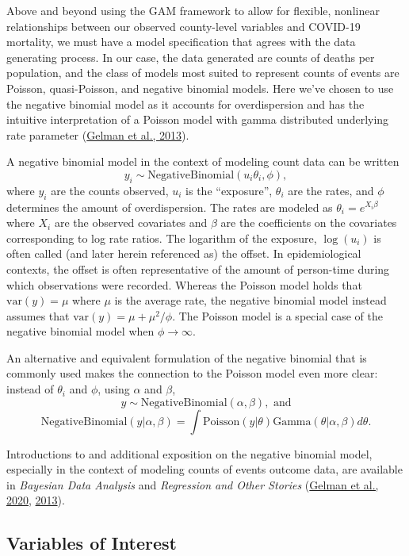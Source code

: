 \documentclass[
]{article}
\begin{document}
Above and beyond using the GAM framework to allow for flexible, nonlinear
relationships between our observed county-level variables and COVID-19
mortality, we must have a model specification that agrees with the data
generating process. In our case, the data generated are counts of deaths per
population, and the class of models most suited to represent counts of events
are Poisson, quasi-Poisson, and negative binomial models. Here we've chosen to
use the negative binomial model as it accounts for overdispersion and has
the intuitive interpretation of a Poisson model with gamma distributed underlying
rate parameter (\protect\hyperlink{ref-gelman_bayesian_2013}{Gelman et al., 2013}).

A negative binomial model in the context of modeling count data can be written
\[y_i \sim \text{NegativeBinomial}(u_i \theta_i, \phi),\]
where \(y_i\) are the counts observed, \(u_i\) is the ``exposure'', \(\theta_i\) are
the rates, and \(\phi\) determines the amount of overdispersion. The rates
are modeled as \(\theta_i = e^{X_i \beta}\) where \(X_i\) are the observed
covariates and \(\beta\) are the coefficients on the covariates corresponding
to log rate ratios. The logarithm of the exposure, \(\log(u_i)\) is often called
(and later herein referenced as) the offset. In epidemiological contexts, the offset
is often representative of the amount of person-time during which observations were recorded. Whereas the Poisson model holds that \(\text{var}(y) = \mu\) where \(\mu\)
is the average rate, the negative binomial model instead assumes that
\(\text{var}(y) = \mu + \mu^2/\phi\). The Poisson model
is a special case of the negative binomial model when \(\phi \to \infty\).

An alternative and equivalent formulation of the negative binomial that is commonly
used makes the connection to the Poisson model even more clear: instead of
\(\theta_i\) and \(\phi\), using \(\alpha\) and \(\beta\),
\[y \sim \text{NegativeBinomial}(\alpha, \beta), \text{ and}\]
\[\text{NegativeBinomial}(y|\alpha, \beta) = \int \text{Poisson}(y|\theta) \text{Gamma}(\theta | \alpha, \beta) d\theta.\]

Introductions to and additional exposition on the negative binomial model,
especially in the context of modeling counts of events outcome data, are
available in \emph{Bayesian Data Analysis} and \emph{Regression and Other Stories}
(\protect\hyperlink{ref-gelman_regression_2020}{Gelman et al., 2020}, \protect\hyperlink{ref-gelman_bayesian_2013}{2013}).

\hypertarget{variables-of-interest}{%
\subsection{Variables of Interest}\label{variables-of-interest}}
\end{document}
